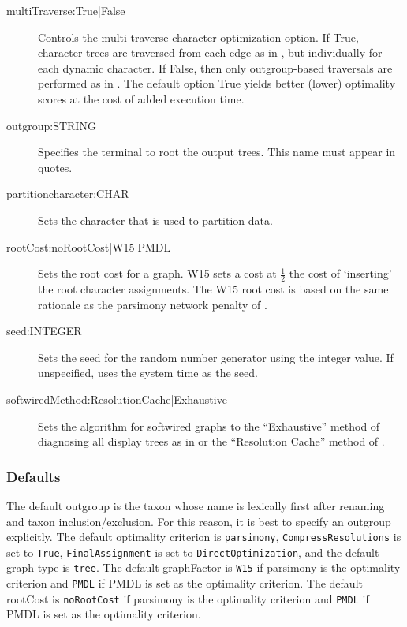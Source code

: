 \begin{description}
			
			\item[multiTraverse:True|False] Controls the multi-traverse character optimization option. 
			If True, character trees are traversed from each edge as in 
			\citep{VaronandWheeler2012,VaronandWheeler2013, POY4, POY5}, but individually for 
			each dynamic character. If False, then only outgroup-based traversals are performed as in 
			\citep{Wheeler1996, POY2, POY3}.  	The default option True yields better (lower) optimality 
			scores at the cost of added execution time.
			
			\item[outgroup:STRING] Specifies the terminal to root the output trees. 
			This name must appear in quotes. 
			
			\item[partitioncharacter:CHAR] Sets the character that is used to partition data. 
			
			\item[rootCost:noRootCost|W15|PMDL] Sets the root cost for a graph. W15 sets a 
			cost at $\frac{1}{2}$ the cost of `inserting' the root character assignments. 
			The W15 root cost is based on the same rationale as the parsimony network penalty of
			 \cite{Wheeler2015}.
			 
			 \item[seed:INTEGER] Sets the seed for the random number generator using the integer
			 value. If unspecified, \phyg uses the system time as the seed.
			 
			 \item[softwiredMethod:ResolutionCache|Exhaustive] Sets the algorithm for softwired graphs 
			 to the ``Exhaustive'' method of diagnosing all display trees as in \cite{Wheeler2015} or
			 the ``Resolution Cache'' method of \cite{WheelerandWashburn2023}.  
			 
		\end{description}
					
	\subsubsection{Defaults} 
		The default outgroup is the taxon whose name is 
		lexically first after renaming and taxon inclusion/exclusion. For this reason, it is best to specify 
		an outgroup explicitly. The default optimality criterion is \texttt{parsimony}, \texttt{CompressResolutions} 
		is set to \texttt{True}, \texttt{FinalAssignment} is set to \texttt{DirectOptimization}, and the default 
		graph type is \texttt{tree}. The default graphFactor is \texttt{W15} if parsimony is the optimality 
		criterion and \texttt{PMDL} if PMDL is set as the optimality criterion. The default rootCost
		is \texttt{noRootCost} if parsimony is the optimality criterion and \texttt{PMDL} if PMDL is set 
		as the optimality criterion.
		
